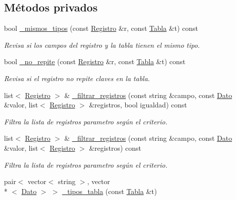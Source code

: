 \subsection*{Métodos privados}
{\bf }\par
\begin{DoxyCompactItemize}
\item 
bool \hyperlink{classBaseDeDatos_adf046a8fde5505668174122997ebb147}{\-\_\-mismos\-\_\-tipos} (const \hyperlink{classRegistro}{Registro} \&r, const \hyperlink{classTabla}{Tabla} \&t) const 
\begin{DoxyCompactList}\small\item\em Revisa si los campos del registro y la tabla tienen el mismo tipo. \end{DoxyCompactList}\item 
bool \hyperlink{classBaseDeDatos_a64ea8616111fb54b0804fe7560668ff6}{\-\_\-no\-\_\-repite} (const \hyperlink{classRegistro}{Registro} \&r, const \hyperlink{classTabla}{Tabla} \&t) const 
\begin{DoxyCompactList}\small\item\em Revisa si el registro no repite claves en la tabla. \end{DoxyCompactList}\item 
list$<$ \hyperlink{classRegistro}{Registro} $>$ \& \hyperlink{classBaseDeDatos_a14edefd67e0fca7c3f7f2e965424916a}{\-\_\-filtrar\-\_\-registros} (const string \&campo, const \hyperlink{classDato}{Dato} \&valor, list$<$ \hyperlink{classRegistro}{Registro} $>$ \&registros, bool igualdad) const 
\begin{DoxyCompactList}\small\item\em Filtra la lista de registros parametro según el criterio. \end{DoxyCompactList}\item 
list$<$ \hyperlink{classRegistro}{Registro} $>$ \& \hyperlink{classBaseDeDatos_ab64f6c5aed35a029620da579853733ba}{\-\_\-filtrar\-\_\-registros} (const string \&campo, const \hyperlink{classDato}{Dato} \&valor, list$<$ \hyperlink{classRegistro}{Registro} $>$ \&registros) const 
\begin{DoxyCompactList}\small\item\em Filtra la lista de registros parametro según el criterio. \end{DoxyCompactList}\item 
pair$<$ vector$<$ string $>$, vector\\*
$<$ \hyperlink{classDato}{Dato} $>$ $>$ \hyperlink{classBaseDeDatos_ad5b99bf20095789ca5636bf0593ad8a5}{\-\_\-tipos\-\_\-tabla} (const \hyperlink{classTabla}{Tabla} \&t)

\end{DoxyCompactItemize}
